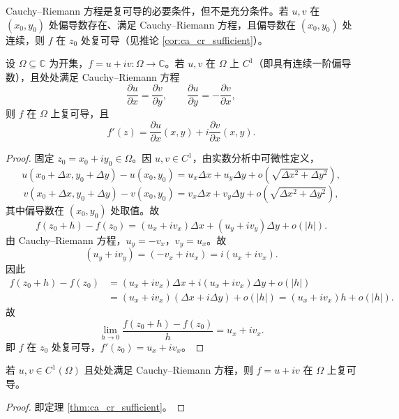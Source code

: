 \begin{remark}\label{rem:ca_cr_sufficiency}
Cauchy--Riemann 方程是复可导的必要条件，但不是充分条件。若 $u, v$ 在 $(x_0, y_0)$ 处偏导数存在、满足 Cauchy--Riemann 方程，且偏导数在 $(x_0, y_0)$ 处连续，则 $f$ 在 $z_0$ 处复可导（见推论 \ref{cor:ca_cr_sufficient}）。
\end{remark}

\begin{theorem}\label{thm:ca_cr_sufficient}
设 $\Omega \subseteq \mathbb{C}$ 为开集，$f = u + iv: \Omega \to \mathbb{C}$。若 $u, v$ 在 $\Omega$ 上 $C^1$（即具有连续一阶偏导数），且处处满足 Cauchy--Riemann 方程
\[
\frac{\partial u}{\partial x} = \frac{\partial v}{\partial y}, \qquad \frac{\partial u}{\partial y} = -\frac{\partial v}{\partial x},
\]
则 $f$ 在 $\Omega$ 上复可导，且
\[
f'(z) = \frac{\partial u}{\partial x}(x, y) + i \frac{\partial v}{\partial x}(x, y).
\]
\end{theorem}

\begin{proof}
固定 $z_0 = x_0 + iy_0 \in \Omega$。因 $u, v \in C^1$，由实数分析中可微性定义，
\[
u(x_0 + \Delta x, y_0 + \Delta y) - u(x_0, y_0) = u_x \Delta x + u_y \Delta y + o(\sqrt{\Delta x^2 + \Delta y^2}),
\]
\[
v(x_0 + \Delta x, y_0 + \Delta y) - v(x_0, y_0) = v_x \Delta x + v_y \Delta y + o(\sqrt{\Delta x^2 + \Delta y^2}),
\]
其中偏导数在 $(x_0, y_0)$ 处取值。故
\[
f(z_0 + h) - f(z_0) = (u_x + iv_x)\Delta x + (u_y + iv_y)\Delta y + o(|h|).
\]
由 Cauchy--Riemann 方程，$u_y = -v_x$，$v_y = u_x$。故
\[
(u_y + iv_y) = (-v_x + i u_x) = i(u_x + i v_x).
\]
因此
\[
\begin{aligned}
f(z_0 + h) - f(z_0) &= (u_x + iv_x)\Delta x + i(u_x + iv_x)\Delta y + o(|h|)\\
&= (u_x + iv_x)(\Delta x + i\Delta y) + o(|h|) = (u_x + iv_x)h + o(|h|).
\end{aligned}
\]
故
\[
\lim_{h \to 0} \frac{f(z_0 + h) - f(z_0)}{h} = u_x + iv_x.
\]
即 $f$ 在 $z_0$ 处复可导，$f'(z_0) = u_x + iv_x$。
\end{proof}

\begin{corollary}\label{cor:ca_cr_sufficient}
若 $u, v \in C^1(\Omega)$ 且处处满足 Cauchy--Riemann 方程，则 $f = u + iv$ 在 $\Omega$ 上复可导。
\end{corollary}

\begin{proof}
即定理 \ref{thm:ca_cr_sufficient}。
\end{proof}

